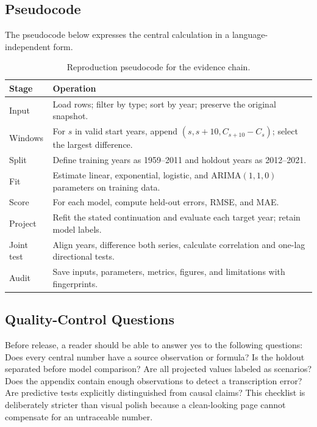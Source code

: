 \documentclass{mcmthesis}
\begin{document}
\begin{appendices}
\subsection{Pseudocode}
The pseudocode below expresses the central calculation in a language-independent form.
\begin{table}[H]
\centering
\small
\caption{Reproduction pseudocode for the evidence chain.}
\begin{tabularx}{\textwidth}{p{}X}
\toprule
Stage & Operation \\
\midrule
Input & Load rows; filter by type; sort by year; preserve the original snapshot. \\
Windows & For $s$ in valid start years, append $(s,s+10,C_{s+10}-C_s)$; select the largest difference. \\
Split & Define training years as 1959--2011 and holdout years as 2012--2021. \\
Fit & Estimate linear, exponential, logistic, and ARIMA$(1,1,0)$ parameters on training data. \\
Score & For each model, compute held-out errors, RMSE, and MAE. \\
Project & Refit the stated continuation and evaluate each target year; retain model labels. \\
Joint test & Align years, difference both series, calculate correlation and one-lag directional tests. \\
Audit & Save inputs, parameters, metrics, figures, and limitations with fingerprints. \\
\bottomrule
\end{tabularx}
\end{table}

\subsection{Quality-Control Questions}
Before release, a reader should be able to answer yes to the following questions: Does every central number have a source observation or formula? Is the holdout separated before model comparison? Are all projected values labeled as scenarios? Does the appendix contain enough observations to detect a transcription error? Are predictive tests explicitly distinguished from causal claims? This checklist is deliberately stricter than visual polish because a clean-looking page cannot compensate for an untraceable number.


\end{appendices}
\end{document}
